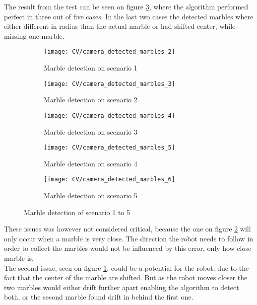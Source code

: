\documentclass[../Head/Main.tex]{subfiles}
\begin{document}
The result from the test can be seen on figure \ref{fig:md_1_5}, where the algorithm performed perfect in three out of five cases. In the last two cases the detected marbles where either different in radius than the actual marble or had shifted center, while missing one marble.
\begin{figure}[H]
	\centering
	\begin{subfigure}[b]{0.196\textwidth}
		\centering
		\texttt{[image: CV/camera\_detected\_marbles\_2]}
		\caption{Marble detection on scenario 1}
	\end{subfigure}
	\hfill
	\begin{subfigure}[b]{0.196\textwidth}
		\centering
		\texttt{[image: CV/camera\_detected\_marbles\_3]}
		\caption{Marble detection on scenario 2}
		\label{fig:md_2_impl}
	\end{subfigure}
	\hfill
	\begin{subfigure}[b]{0.196\textwidth}
		\centering
		\texttt{[image: CV/camera\_detected\_marbles\_4]}
		\caption{Marble detection on scenario 3}
	\end{subfigure}
	\hfill
	\begin{subfigure}[b]{0.196\textwidth}
		\centering
		\texttt{[image: CV/camera\_detected\_marbles\_5]}
		\caption{Marble detection on scenario 4}
		\label{fig:md_4_impl}
	\end{subfigure}
	\hfill
	\begin{subfigure}[b]{0.196\textwidth}
		\centering
		\texttt{[image: CV/camera\_detected\_marbles\_6]}
		\caption{Marble detection on scenario 5}
	\end{subfigure}
	\caption{Marble detection of scenario 1 to 5}
	\label{fig:md_1_5}
\end{figure} 
These issues was however not considered critical, because the one on figure \ref{fig:md_4_impl} will only occur when a marble is very close. The direction the robot needs to follow in order to collect the marbles would not be influenced by this error, only how close marble is.\\
The second issue, seen on figure \ref{fig:md_2_impl}, could be a potential for the robot, due to the fact that the center of the marble are shifted. But as the robot moves closer the two marbles would either drift further apart enabling the algorithm to detect both, or the second marble found drift in behind the first one. 
\end{document}
